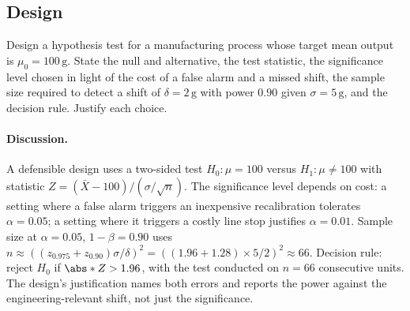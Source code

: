 \subsection*{Design}

\begin{exercise}
Design a hypothesis test for a manufacturing process whose target
mean output is $\mu_{0} = 100\,\si{\gram}$. State the null and
alternative, the test statistic, the significance level chosen
in light of the cost of a false alarm and a missed shift, the
sample size required to detect a shift of $\delta = 2\,\si{\gram}$
with power $0.90$ given $\sigma = 5\,\si{\gram}$, and the decision
rule. Justify each choice.

\paragraph{Discussion.} A defensible design uses a two-sided
test $H_{0}: \mu = 100$ versus $H_{1}: \mu \neq 100$ with
statistic $Z = (\bar{X} - 100)/(\sigma/\sqrt{n})$. The
significance level depends on cost: a setting where a false alarm
triggers an inexpensive recalibration tolerates $\alpha = 0.05$;
a setting where it triggers a costly line stop justifies
$\alpha = 0.01$. Sample size at $\alpha = 0.05$, $1-\beta =
0.90$ uses $n \approx ((z_{0.975} + z_{0.90})\sigma/\delta)^{2}
= ((1.96 + 1.28) \times 5 / 2)^{2} \approx 66$. Decision rule:
reject $H_{0}$ if $\abs*{Z} > 1.96$, with the test conducted on
$n = 66$ consecutive units. The design's justification names
both errors and reports the power against the
engineering-relevant shift, not just the significance.
\end{exercise}

